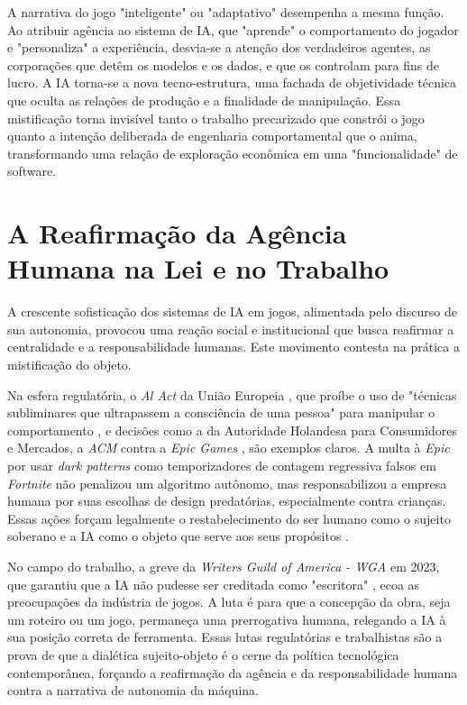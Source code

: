 A narrativa do jogo "inteligente" ou "adaptativo" desempenha a mesma função. Ao atribuir agência ao sistema de IA, que "aprende" o 
comportamento do jogador e "personaliza" a experiência, desvia-se a atenção dos verdadeiros agentes, as corporações que detêm os 
modelos e os dados, e que os controlam para fins de lucro. A IA torna-se a nova tecno-estrutura, uma fachada de objetividade técnica 
que oculta as relações de produção e a finalidade de manipulação. Essa mistificação torna invisível tanto o trabalho precarizado que 
constrói o jogo \cite{GraySuri2019} quanto a intenção deliberada de engenharia comportamental que o anima, transformando uma relação de exploração 
econômica em uma "funcionalidade" de software.

\section{A Reafirmação da Agência Humana na Lei e no Trabalho}\label{sec:reafirmacao_agencia_humana}

A crescente sofisticação dos sistemas de IA em jogos, alimentada pelo discurso de sua autonomia, provocou uma reação social e 
institucional que busca reafirmar a centralidade e a responsabilidade humanas. Este movimento contesta na prática a mistificação do 
objeto.

Na esfera regulatória, o \textit{Al Act} da União Europeia \cite{EU_AI_Act2024}, que proíbe o uso de "técnicas subliminares que ultrapassem a consciência 
de uma pessoa" para manipular o comportamento , e decisões como a da Autoridade Holandesa para Consumidores e Mercados, a \textit{ACM} 
contra a \textit{Epic Games} \cite{ACM2024EpicGames}, são exemplos claros. A multa à \textit{Epic} por usar \textit{dark patterns} como temporizadores de 
contagem regressiva falsos em \textit{Fortnite} não penalizou um algoritmo autônomo, mas responsabilizou a empresa humana por suas 
escolhas de design predatórias, especialmente contra crianças. Essas ações forçam legalmente o restabelecimento do ser humano como o 
sujeito soberano e a IA como o objeto que serve aos seus propósitos \cite{EU_AI_Act2024}.

No campo do trabalho, a greve da \textit{Writers Guild of America - WGA} em 2023, que garantiu que a IA não pudesse ser creditada 
como "escritora" \cite{WGA_MBA2023} , ecoa as preocupações da indústria de jogos. A luta é para que a concepção da obra, seja um roteiro ou um jogo, 
permaneça uma prerrogativa humana, relegando a IA à sua posição correta de ferramenta. Essas lutas regulatórias e trabalhistas são a 
prova de que a dialética sujeito-objeto é o cerne da política tecnológica contemporânea, forçando a reafirmação da agência e da 
responsabilidade humana contra a narrativa de autonomia da máquina.

